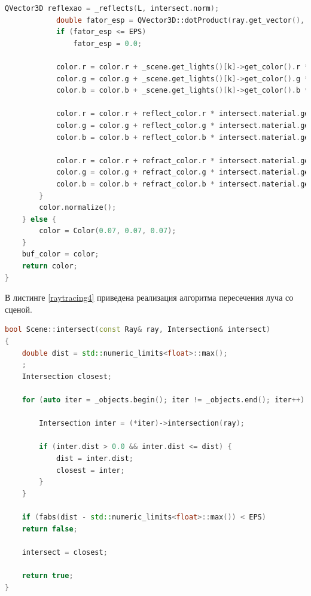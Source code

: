 \begin{lstlisting}[label=raytracing3,caption=Реализация алгоритма испускания луча (окончание), language=C++]
			QVector3D reflexao = _reflects(L, intersect.norm);
			double fator_esp = QVector3D::dotProduct(ray.get_vector(), reflexao);
			if (fator_esp <= EPS)
				fator_esp = 0.0;
			
			color.r = color.r + _scene.get_lights()[k]->get_color().r * _scene.get_lights()[k]->get_intensity() * pow(fator_esp, intersect.material.get_k()) * intersect.material.get_specular().r * intersect.material.get_ks();
			color.g = color.g + _scene.get_lights()[k]->get_color().g * _scene.get_lights()[k]->get_intensity() * pow(fator_esp, intersect.material.get_k()) * intersect.material.get_specular().g * intersect.material.get_ks();
			color.b = color.b + _scene.get_lights()[k]->get_color().b * _scene.get_lights()[k]->get_intensity() * pow(fator_esp, intersect.material.get_k()) * intersect.material.get_specular().b * intersect.material.get_ks();
			
			color.r = color.r + reflect_color.r * intersect.material.get_k_refl();
			color.g = color.g + reflect_color.g * intersect.material.get_k_refl();
			color.b = color.b + reflect_color.b * intersect.material.get_k_refl();
			
			color.r = color.r + refract_color.r * intersect.material.get_k_refr();
			color.g = color.g + refract_color.g * intersect.material.get_k_refr();
			color.b = color.b + refract_color.b * intersect.material.get_k_refr();
		}
		color.normalize();
	} else {
		color = Color(0.07, 0.07, 0.07);
	}
	buf_color = color;
	return color;
}
\end{lstlisting}

В листинге \ref{raytracing4}  приведена реализация алгоритма пересечения луча со сценой.

\begin{lstlisting}[label=raytracing4,caption=Реализация алгоритма пересечения луча со сценой, language=C++]
bool Scene::intersect(const Ray& ray, Intersection& intersect)
{
	double dist = std::numeric_limits<float>::max();
	;
	Intersection closest;
	
	for (auto iter = _objects.begin(); iter != _objects.end(); iter++) {
		
		Intersection inter = (*iter)->intersection(ray);
		
		if (inter.dist > 0.0 && inter.dist <= dist) {
			dist = inter.dist;
			closest = inter;
		}
	}
	
	if (fabs(dist - std::numeric_limits<float>::max()) < EPS)
	return false;
	
	intersect = closest;
	
	return true;
}
\end{lstlisting}

